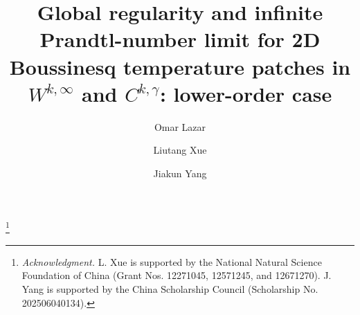 \documentclass[reqno,11pt,a4paper]{amsart}
\begin{document}
\title[$W^{k,\infty}$ and $C^{k,\gamma}$ regularity of temperature patches for 2D Boussinesq system]{Global regularity and infinite Prandtl-number limit for 2D Boussinesq temperature patches in $W^{k,\infty}$ and $C^{k,\gamma}$: lower-order case}
\author{Omar Lazar}
\address{Department of mathematics and statistics, American University of Sharjah, Sharjah, UAE}
\author{Liutang Xue}
\address{School of Mathematical Sciences, Laboratory of Mathematics and Complex Systems (MOE),  Beijing Normal University, Beijing 100875, P.R. China}
\author{Jiakun Yang}
\address{School of Mathematical Sciences, Laboratory of Mathematics and Complex Systems (MOE),  Beijing Normal University, Beijing 100875, P.R. China}

\thanks{\textit{Acknowledgment.} 
L. Xue is supported by the National Natural Science
Foundation of China (Grant Nos. 12271045, 12571245, and 12671270).
J. Yang is supported by the China Scholarship Council
(Scholarship No. 202506040134).
}


\renewcommand{\subjclassname}{\textup{2020} Mathematics Subject Classification}

\end{document}
